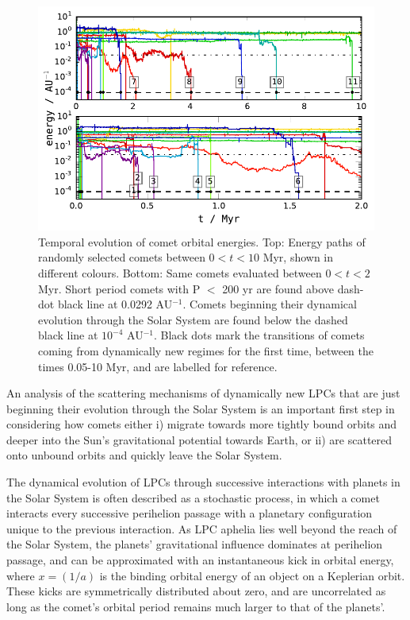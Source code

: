 \begin{figure}[t!]
    \centering
    \includegraphics{figures/ae_timeplot.pdf}
    \caption[Random walks in energy space]{Temporal evolution of comet orbital energies. Top: Energy paths of randomly selected comets between $0<t<10$ Myr, shown in different colours. Bottom: Same comets evaluated between $0<t<2$ Myr. Short period comets with P $<$ 200 yr are found above dash-dot black line at 0.0292 AU$^{-1}$.  Comets beginning their dynamical evolution through the Solar System are found below the dashed black line at $10^{-4}$ AU$^{-1}$. Black dots mark the transitions of comets coming from dynamically new regimes for the first time, between the times 0.05-10 Myr, and are labelled for reference.}
    \label{fig:timeplot}
\end{figure}

An analysis of the scattering mechanisms of dynamically new LPCs that are just beginning their evolution through the Solar System is an important first step in considering how comets  either i) migrate towards more tightly bound orbits and deeper into the Sun's gravitational potential towards Earth, or ii) are scattered onto unbound orbits and quickly leave the Solar System.

The dynamical evolution of LPCs through successive interactions with planets in the Solar System is often described as a stochastic process, in which a comet interacts every successive perihelion passage with a planetary configuration unique to the previous interaction. As LPC aphelia lies well beyond the reach of the Solar System, the planets' gravitational influence dominates at perihelion passage, and can be approximated with an instantaneous kick in orbital energy, where $x = (1/a)$ is the binding orbital energy of an object on a Keplerian orbit. These kicks are symmetrically distributed about zero, and are uncorrelated as long as the comet's orbital period remains much larger to that of the planets'. 

